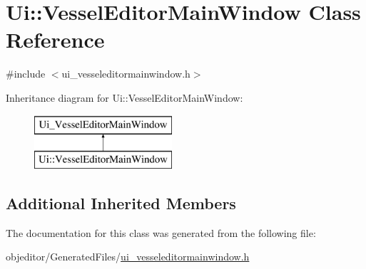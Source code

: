 \hypertarget{class_ui_1_1_vessel_editor_main_window}{}\section{Ui\+::Vessel\+Editor\+Main\+Window Class Reference}
\label{class_ui_1_1_vessel_editor_main_window}


{\ttfamily \#include $<$ui\+\_\+vesseleditormainwindow.\+h$>$}

Inheritance diagram for Ui\+::Vessel\+Editor\+Main\+Window\+:\begin{figure}[H]
\begin{center}
\leavevmode
\includegraphics[height=2.000000cm]{d9/d8a/class_ui_1_1_vessel_editor_main_window}
\end{center}
\end{figure}
\subsection*{Additional Inherited Members}


The documentation for this class was generated from the following file\+:\begin{DoxyCompactItemize}
\item 
objeditor/\+Generated\+Files/\mbox{\hyperlink{ui__vesseleditormainwindow_8h}{ui\+\_\+vesseleditormainwindow.\+h}}\end{DoxyCompactItemize}
